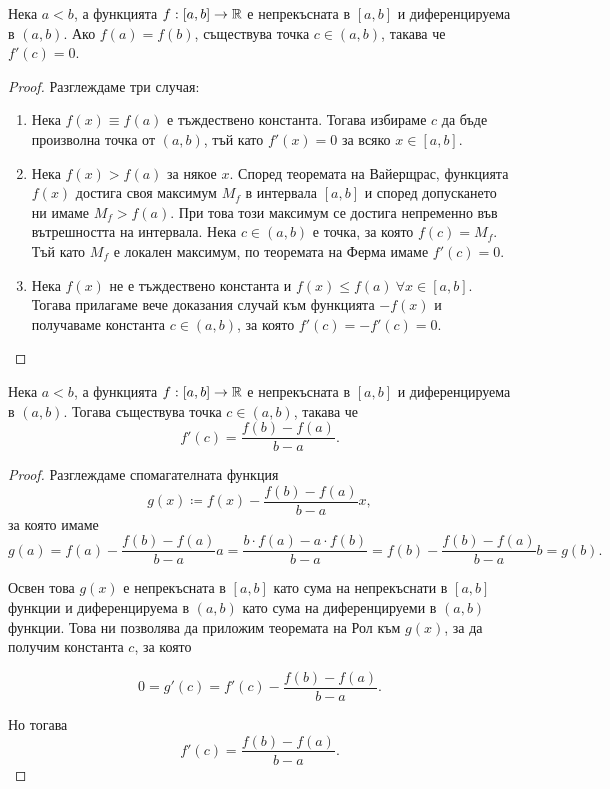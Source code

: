 \documentclass[numbers=endperiod, DIV=15, bibliography=totocnumbered]{scrartcl}
\begin{document}
\begin{theorem}[Рол]
  Нека $a < b$, а функцията $f: [a, b] \to \mathbb{R}$ е непрекъсната в $[a, b]$ и диференцируема в $(a, b)$. Ако $f(a) = f(b)$, съществува точка $c \in (a, b)$, такава че $f'(c) = 0$.
\end{theorem}
\begin{proof}
  Разглеждаме три случая:
  \begin{enumerate}
    \item Нека $f(x) \equiv f(a)$ е тъждествено константа. Тогава избираме $c$ да бъде произволна точка от $(a, b)$, тъй като $f'(x) = 0$ за всяко $x \in [a, b]$.
    \item Нека $f(x) > f(a)$ за някое $x$. Според теоремата на Вайерщрас, функцията $f(x)$ достига своя максимум $M_f$ в интервала $[a, b]$ и според допускането ни имаме $M_f > f(a)$. При това този максимум се достига непременно във вътрешността на интервала. Нека $c \in (a, b)$ е точка, за която $f(c) = M_f$. Тъй като $M_f$ е локален максимум, по теоремата на Ферма имаме $f'(c) = 0$.
    \item Нека $f(x)$ не е тъждествено константа и $f(x) \leq f(a)~\forall x \in [a, b]$. Тогава прилагаме вече доказания случай към функцията $-f(x)$ и получаваме константа $c \in (a, b)$, за която $f'(c) = -f'(c) = 0$.
  \end{enumerate}
\end{proof}

\begin{theorem}
  Нека $a < b$, а функцията $f: [a, b] \to \mathbb{R}$ е непрекъсната в $[a, b]$ и диференцируема в $(a, b)$. Тогава съществува точка $c \in (a, b)$, такава че
  \begin{displaymath}
    f'(c) = \frac {f(b) - f(a)} {b-a}.
  \end{displaymath}
\end{theorem}
\begin{proof}
  Разглеждаме спомагателната функция
  \begin{displaymath}
    g(x) \coloneqq f(x) - \frac {f(b) - f(a)} {b-a} x,
  \end{displaymath}
  за която имаме
  \begin{displaymath}
    g(a)
    =
    f(a) - \frac {f(b) - f(a)} {b-a} a
    =
    \frac {b \cdot f(a) - a \cdot f(b)} {b-a}
    =
    f(b) - \frac {f(b) - f(a)} {b-a} b
    =
    g(b).
  \end{displaymath}

  Освен това $g(x)$ е непрекъсната в $[a, b]$ като сума на непрекъснати в $[a, b]$ функции и диференцируема в $(a, b)$ като сума на диференцируеми в $(a, b)$ функции. Това ни позволява да приложим теоремата на Рол към $g(x)$, за да получим константа $c$, за която

  \begin{displaymath}
    0 = g'(c) = f'(c) - \frac {f(b) - f(a)} {b-a}.
  \end{displaymath}

  Но тогава
  \begin{displaymath}
    f'(c) = \frac {f(b) - f(a)} {b-a}.
  \end{displaymath}
\end{proof}
\end{document}
